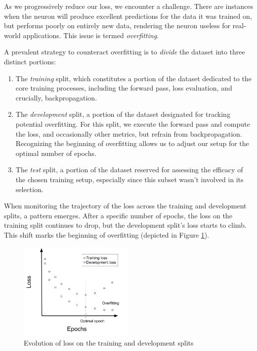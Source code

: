 \label{02_nn_overfitting}


As we progressively reduce our loss, we encounter a challenge. There are instances when the neuron will produce excellent predictions for the data it was trained on, but performs poorly on entirely new data, rendering the neuron useless for real-world applications. This issue is termed \emph{overfitting}.

A prevalent strategy to counteract overfitting is to \emph{divide} the dataset into three distinct portions:

\begin{enumerate}
\item The \emph{training} split, which constitutes a portion of the dataset dedicated to the core training processes, including the forward pass, loss evaluation, and crucially, backpropagation.
\item The \emph{development} split, a portion of the dataset designated for tracking potential overfitting. For this split, we execute the forward pass and compute the loss, and occasionally other metrics, but refrain from backpropagation. Recognizing the beginning of overfitting allows us to adjust our setup for the optimal number of epochs.
\item The \emph{test} split, a portion of the dataset reserved for assessing the efficacy of the chosen training setup, especially since this subset wasn't involved in its selection.
\end{enumerate}

When monitoring the trajectory of the loss across the training and development splits, a pattern emerges. After a specific number of epochs, the loss on the training split continues to drop, but the development split's loss starts to climb. This shift marks the beginning of overfitting (depicted in Figure \ref{fig:02_nn_split_loss_evolution}).

\begin{figure}
    \centering
    \includegraphics[width=0.5\textwidth]{Figures/02/02_split_loss_evolution.png}
    \caption{Evolution of loss on the training and development splits}
    \label{fig:02_nn_split_loss_evolution}
\end{figure}


